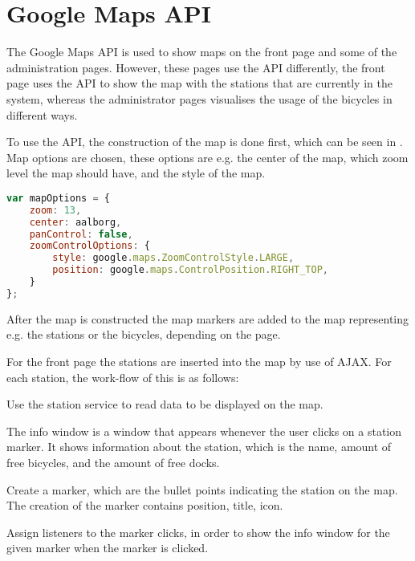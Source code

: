 \section{Google Maps API}\label{sec:googlemapsapi}
The Google Maps API \citep{misc:googlemapsapi} is used to show maps on the front page and some of the administration pages.
However, these pages use the API differently, the front page uses the API to show the map with the stations that are currently in the system, whereas the administrator pages visualises the usage of the bicycles in different ways.

To use the API, the construction of the map is done first, which can be seen in .
Map options are chosen, these options are e.g. the center of the map, which zoom level the map should have, and the style of the map.

\begin{minipage}{\textwidth}
\begin{lstlisting}[caption={Construction of the map.}, label={lst:mapoptions}, language=Javascript]
var mapOptions = {
	zoom: 13,
	center: aalborg,
	panControl: false,
    zoomControlOptions: {
		style: google.maps.ZoomControlStyle.LARGE,
		position: google.maps.ControlPosition.RIGHT_TOP,
	}
};
\end{lstlisting}
\end{minipage}

After the map is constructed the map markers are added to the map representing e.g. the stations or the bicycles, depending on the page.

For the front page the stations are inserted into the map by use of AJAX.
For each station, the work-flow of this is as follows:

\begin{description}[style=nextline]
	\item[Gather data]
	Use the station service to read data to be displayed on the map.
	\item[Create info window]
	The info window is a window that appears whenever the user clicks on a station marker.
	It shows information about the station, which is the name, amount of free bicycles, and the amount of free docks.
	\item[Marker creation]
	Create a marker, which are the bullet points indicating the station on the map.
	The creation of the marker contains position, title, icon.
	\item[Assign listeners]
	Assign listeners to the marker clicks, in order to show the info window for the given marker when the marker is clicked.
\end{description}

